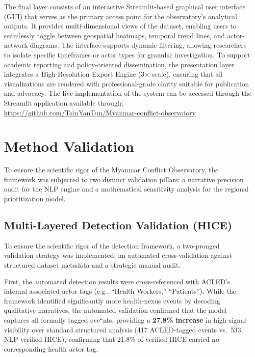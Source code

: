 \documentclass[conference]{IEEEtran}
\begin{document}
The final layer consists of an interactive Streamlit-based graphical user interface (GUI) that serves as the primary access point for the observatory's analytical outputs. It provides multi-dimensional views of the dataset, enabling users to seamlessly toggle between geospatial heatmaps, temporal trend lines, and actor-network diagrams. The interface supports dynamic filtering, allowing researchers to isolate specific timeframes or actor types for granular investigation. To support academic reporting and policy-oriented dissemination, the presentation layer integrates a High-Resolution Export Engine (3$\times$ scale), ensuring that all visualizations are rendered with professional-grade clarity suitable for publication and advocacy. The live implementation of the system can be accessed through the Streamlit application available through: \href{https://github.com/TainYanTun/Myanmar-conflict-observatory}{https://github.com/TainYanTun/Myanmar-conflict-observatory}

\section{Method Validation}

To ensure the scientific rigor of the Myanmar Conflict Observatory, the framework was subjected to two distinct validation pillars: a narrative precision audit for the NLP engine and a mathematical sensitivity analysis for the regional prioritization model.

\subsection{Multi-Layered Detection Validation (HICE)}
To ensure the scientific rigor of the detection framework, a two-pronged validation strategy was implemented: an automated cross-validation against structured dataset metadata and a strategic manual audit. 

First, the automated detection results were cross-referenced with ACLED's internal associated actor tags (e.g., ``Health Workers,'' ``Patients''). While the framework identified significantly more health-nexus events by decoding qualitative narratives, the automated validation confirmed that the model captures all formally tagged eve``nts, providing a \textbf{27.8\% increase} in high-signal visibility over standard structured analysis (417 ACLED-tagged events vs.\ 533 NLP-verified HICE), confirming that 21.8\% of verified HICE carried no corresponding health actor tag.
\end{document}
